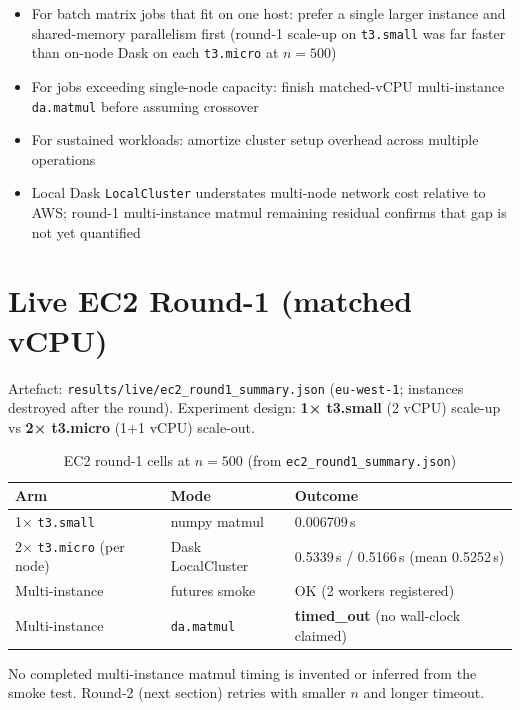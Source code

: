 \begin{itemize}
    \item For batch matrix jobs that fit on one host: prefer a single larger instance and shared-memory parallelism first (round-1 scale-up on \texttt{t3.small} was far faster than on-node Dask on each \texttt{t3.micro} at $n{=}500$)
    \item For jobs exceeding single-node capacity: finish matched-vCPU multi-instance \texttt{da.matmul} before assuming crossover
    \item For sustained workloads: amortize cluster setup overhead across multiple operations
    \item Local Dask \texttt{LocalCluster} understates multi-node network cost relative to AWS; round-1 multi-instance matmul remaining residual confirms that gap is not yet quantified
\end{itemize}

\section{Live EC2 Round-1 (matched vCPU)}
\label{sec:live-ec2-round1}

Artefact: \texttt{results/live/ec2\_round1\_summary.json} (\texttt{eu-west-1}; instances destroyed after the round). Experiment design: \textbf{1× t3.small} (2 vCPU) scale-up vs \textbf{2× t3.micro} (1+1 vCPU) scale-out.

\begin{table}[ht]
\centering
\caption{EC2 round-1 cells at $n{=}500$ (from \texttt{ec2\_round1\_summary.json})}
\label{tab:ec2-round1}
\begin{tabular}{lll}
\toprule
\textbf{Arm} & \textbf{Mode} & \textbf{Outcome} \\
\midrule
1× \texttt{t3.small} & numpy matmul & 0.006709\,s \\
2× \texttt{t3.micro} (per node) & Dask LocalCluster & 0.5339\,s / 0.5166\,s (mean 0.5252\,s) \\
Multi-instance & futures smoke & OK (2 workers registered) \\
Multi-instance & \texttt{da.matmul} & \textbf{timed\_out} (no wall-clock claimed) \\
\bottomrule
\end{tabular}
\end{table}

No completed multi-instance matmul timing is invented or inferred from the smoke test. Round-2 (next section) retries with smaller $n$ and longer timeout.

